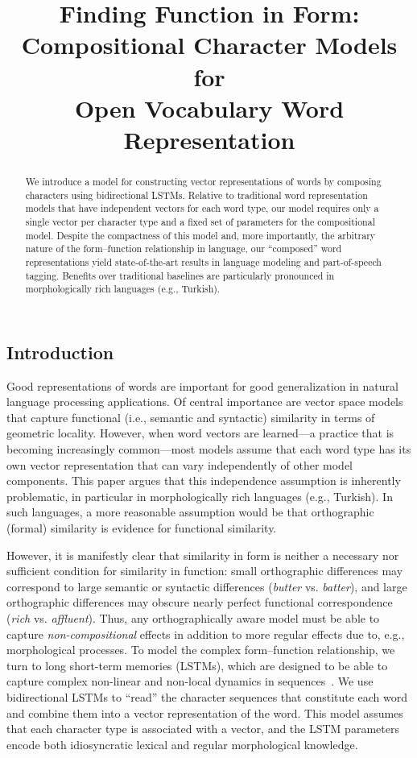 \documentclass[11pt]{article}
\title{Finding Function in Form: Compositional Character Models for\\ Open Vocabulary Word Representation}
{\author{Wang Ling ~~~ Tiago Lu\'{\i}s ~~~ Lu\'{\i}s Marujo ~~~ Ram\'on Fernandez Astudillo\\ \textbf{Silvio Amir ~~~ Chris Dyer ~~~ Alan W Black ~~~ Isabel Trancoso} \\\\
  LF Spoken Systems Lab, INESC-ID, Lisbon, Portugal\\
  Language Technologies Institute, Carnegie Mellon University, Pittsburgh, PA, USA\\
  Instituto Superior T\'{e}cnico, Lisbon, Portugal\\
{\tt \{lingwang,lmarujo,cdyer,awb\}@cs.cmu.edu} \\ \tt \{ramon.astudillo,samir,tmcl,isabel.trancoso\}@inesc-id.pt\\}
}
\date{}
\begin{document}
\maketitle
\begin{CJK*}{UTF8}{gbsn}
\begin{abstract}

We introduce a model for constructing vector representations of words by composing characters using bidirectional LSTMs. Relative to traditional word representation models that have independent vectors for each word type, our model requires only a single vector per character type and a fixed set of parameters for the compositional model. Despite the compactness of this model and, more importantly, the arbitrary nature of the form--function relationship in language, our ``composed'' word representations yield state-of-the-art results in language modeling and part-of-speech tagging. Benefits over traditional baselines are particularly pronounced in morphologically rich languages (e.g., Turkish).
\end{abstract}

\section{Introduction}
Good representations of words are important for good generalization in natural language processing applications. Of central importance are vector space models that capture functional (i.e., semantic and syntactic) similarity in terms of geometric locality. However, when word vectors are learned---a practice that is becoming increasingly common---most models assume that each word type has its own vector representation that can vary independently of other model components. This paper argues that this independence assumption is inherently problematic, in particular in morphologically rich languages (e.g., Turkish). In such languages, a more reasonable assumption would be that orthographic (formal) similarity is evidence for functional similarity.

However, it is manifestly clear that similarity in form is neither a necessary nor sufficient condition for similarity in function: small orthographic differences may correspond to large semantic or syntactic differences (\emph{butter} vs. \emph{batter}), and large orthographic differences may obscure nearly perfect functional correspondence (\emph{rich} vs. \emph{affluent}).  Thus, any orthographically aware model must be able to capture \emph{non-compositional} effects in addition to more regular effects due to, e.g., morphological processes. To model the complex form--function relationship, we turn to long short-term memories (LSTMs), which are designed to be able to capture complex non-linear and non-local dynamics in sequences~\cite{Hochreiter:1997:LSM:1246443.1246450}. We use bidirectional LSTMs to ``read'' the character sequences that constitute each word and combine them into a vector representation of the word. This model assumes that each character type is associated with a vector, and the LSTM parameters encode both idiosyncratic lexical and regular morphological knowledge.


\end{CJK*}
\end{document}
